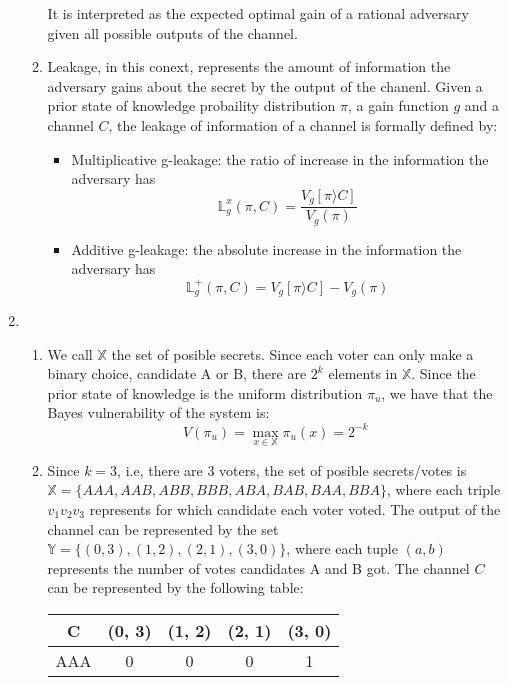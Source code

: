 \documentclass{article}
\begin{document}
\begin{enumerate}
\begin{enumerate}
		            It is interpreted as the expected optimal gain of a rational adversary given all possible outputs of the channel.
		      \item Leakage, in this conext, represents the amount of information the adversary gains about the secret by the output of the chanenl.
		            Given a prior state of knowledge probaility distribution \(\pi\), a gain function \(g\) and a channel \(C\),
		            the leakage of information of a channel is formally defined by:
		            \begin{itemize}
			            \item Multiplicative g-leakage: the ratio of increase in the information the adversary has
			                  \[\mathbb{L}_{g}^{x}(\pi, C) = \frac{V_g[\pi \rangle C]}{V_g(\pi)}\]
			            \item Additive g-leakage: the absolute increase in the information the adversary has
			                  \[\mathbb{L}_{g}^{+}(\pi, C) = V_g[\pi \rangle C] - V_g(\pi)\]
		            \end{itemize}
	      \end{enumerate}
	\item
	      \begin{enumerate}
		      \item We call \(\mathbb{X}\) the set of posible secrets. Since each voter can only make a binary choice, candidate
		            A or B, there are \(2^k\) elements in \(\mathbb{X}\). Since the prior state of knowledge is the uniform distribution \(\pi_u\),
		            we have that the Bayes vulnerability of the system is:
		            \[V(\pi_u) = \max_{x \in \mathbb{X}} \pi_u(x) = 2^{-k}\]
		      \item Since \(k = 3\), i.e, there are \(3\) voters, the set of posible secrets/votes is \(\mathbb{X} = \{AAA, AAB, ABB, BBB, ABA, BAB, BAA, BBA\}\), where each triple \(v_1v_2v_3\) represents for which candidate each voter voted. The output of the channel can be represented
		            by the set \(\mathbb{Y} = \{(0, 3), (1, 2), (2, 1), (3, 0)\}\), where each tuple \((a, b)\) represents the number of votes candidates A and B got. The channel \(C\) can be represented by the following table:
		            \begin{table}[H]
			            \centering
			            \begin{tabular}{|c|c|c|c|c|}
				            \hline
				            C   & (0, 3) & (1, 2) & (2, 1) & (3, 0) \\ \hline
				            AAA & 0      & 0      & 0      & 1      \\ \hline

\end{tabular}
\end{table}
\end{enumerate}
\end{enumerate}
\end{document}
